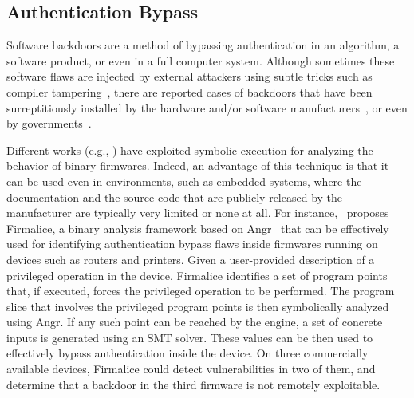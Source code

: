 \vspace{-1mm} %
\subsection{Authentication Bypass}
\label{ss:auth-bypass}
Software backdoors are a method of bypassing authentication in an algorithm, a software product, or even in a full computer system. Although sometimes these software flaws are injected by external attackers using subtle tricks such as compiler tampering~\cite{KRS-TR74}, there are reported cases of backdoors that have been surreptitiously installed by the hardware and/or software manufacturers~\cite{CZF-USEC14}, or even by governments~\cite{NSA-BACKDOOR}. 

Different works (e.g., \cite{DMR-USEC13,ZBF-NDSS14,FIRMALICE-NDSS15}) have exploited symbolic execution for analyzing the behavior of binary firmwares. Indeed, an advantage of this technique is that it can be used even in environments, such as embedded systems, where the documentation and the source code that are publicly released by the manufacturer are typically very limited or none at all. For instance,~\cite{FIRMALICE-NDSS15} proposes Firmalice, a binary analysis framework based on {\sc Angr}~\cite{ANGR-SSP16} that can be effectively used for identifying authentication bypass flaws inside firmwares running on devices such as routers and printers. Given a user-provided description of a privileged operation in the device, Firmalice identifies a set of program points that, if executed, forces the privileged operation to be performed. The program slice that involves the privileged program points is then symbolically analyzed using {\sc Angr}. If any such point can be reached by the engine, a set of concrete inputs is generated using an SMT solver. These values can be then used to effectively bypass authentication inside the device. On three commercially available devices, Firmalice could detect vulnerabilities in two of them, and determine that a backdoor in the third firmware is not remotely exploitable.
